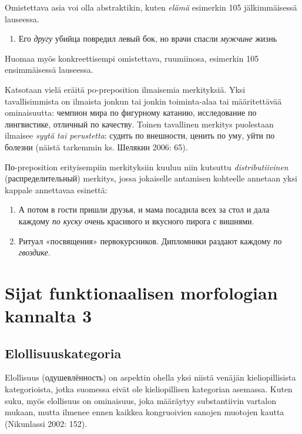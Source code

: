\documentclass[]{scrreprt}
\providecommand{\tightlist}{%
  \setlength{\itemsep}{0pt}\setlength{\parskip}{0pt}}
\begin{document}
Omistettava asia voi olla abstraktikin, kuten \emph{elämä} esimerkin 105
jälkimmäisessä lauseessa.

\begin{enumerate}
\def\labelenumi{(\arabic{enumi})}
\setcounter{enumi}{104}
\tightlist
\item
  Его \emph{другу} убийца повредил левый бок, но врачи спасли
  \emph{мужчине} жизнь
\end{enumerate}

Huomaa myös konkreettisempi omistettava, ruumiinosa, esimerkin 105
ensimmäisessä lauseessa.

Katsotaan vielä eräitä po-preposition ilmaisemia merkityksiä. Yksi
tavallisimmista on ilmaista jonkun tai jonkin toiminta-alaa tai
määritettävää ominaisuutta: чемпион мира по фигурному катанию,
исследование по лингвистике, отличный по качеству. Toinen tavallinen
merkitys puolestaan ilmaisee \emph{syytä tai perustetta}: судить по
внешности, ценить по уму, уйти по болезни (näistä tarkemmin ks. Шелякин
2006: 65).

По-preposition erityisempiin merkityksiin kuuluu niin kutsuttu
\emph{distributiivinen} (распределительный) merkitys, jossa jokaiselle
antamisen kohteelle annetaan yksi kappale annettavaa esinettä:

\begin{enumerate}
\def\labelenumi{(\arabic{enumi})}
\setcounter{enumi}{105}
\tightlist
\item
  А потом в гости пришли друзья, и мама посадила всех за стол и дала
  каждому \emph{по куску} очень красивого и вкусного пирога с вишнями.
\item
  Ритуал «посвящения» первокурсников. Дипломники раздают каждому
  \emph{по гвоздике}.
\end{enumerate}

\chapter{Sijat funktionaalisen morfologian kannalta
3}\label{luento-9-sijat-funktionaalisen-morfologian-kannalta-3}


\section{Elollisuuskategoria}\label{elollisuuskategoria}

Elollisuus (одушевлённость) on aspektin ohella yksi niistä venäjän
kieliopillisista kategorioista, jotka suomessa eivät ole kieliopillisen
kategorian asemassa. Kuten suku, myös elollisuus on ominaisuus, joka
määräytyy substantiivin vartalon mukaan, mutta ilmenee ennen kaikkea
kongruoivien sanojen muotojen kautta (Nikunlassi 2002: 152).
\end{document}
